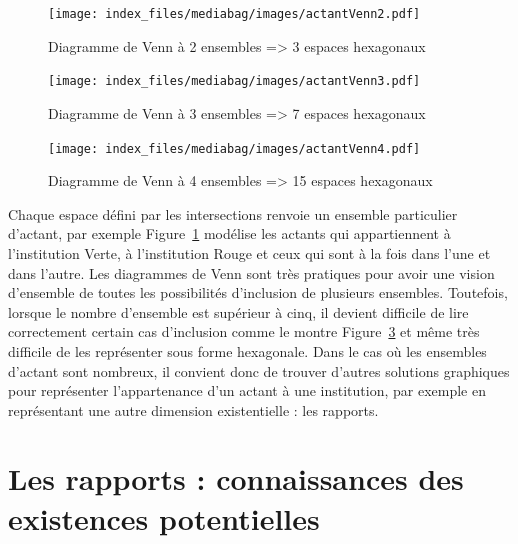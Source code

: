 \documentclass[
  letterpaper,
  DIV=11,
  numbers=noendperiod]{scrreprt}
\begin{document}
\begin{figure}

{\centering \texttt{[image: index\_files/mediabag/images/actantVenn2.pdf]}

}

\caption{\label{fig-hexaVenn2}Diagramme de Venn à 2 ensembles
=\textgreater{} 3 espaces hexagonaux}

\end{figure}

\begin{figure}

{\centering \texttt{[image: index\_files/mediabag/images/actantVenn3.pdf]}

}

\caption{\label{fig-hexaVenn3}Diagramme de Venn à 3 ensembles
=\textgreater{} 7 espaces hexagonaux}

\end{figure}

\begin{figure}

{\centering \texttt{[image: index\_files/mediabag/images/actantVenn4.pdf]}

}

\caption{\label{fig-hexaVenn4}Diagramme de Venn à 4 ensembles
=\textgreater{} 15 espaces hexagonaux}

\end{figure}

Chaque espace défini par les intersections renvoie un ensemble
particulier d'actant, par exemple Figure~\ref{fig-hexaVenn2} modélise
les actants qui appartiennent à l'institution Verte, à l'institution
Rouge et ceux qui sont à la fois dans l'une et dans l'autre. Les
diagrammes de Venn sont très pratiques pour avoir une vision d'ensemble
de toutes les possibilités d'inclusion de plusieurs ensembles.
Toutefois, lorsque le nombre d'ensemble est supérieur à cinq, il devient
difficile de lire correctement certain cas d'inclusion comme le montre
Figure~\ref{fig-hexaVenn4} et même très difficile de les représenter
sous forme hexagonale. Dans le cas où les ensembles d'actant sont
nombreux, il convient donc de trouver d'autres solutions graphiques pour
représenter l'appartenance d'un actant à une institution, par exemple en
représentant une autre dimension existentielle : les rapports.

\hypertarget{sec-rapportsInstExis}{%
\section{Les rapports : connaissances des existences
potentielles}\label{sec-rapportsInstExis}}
\end{document}
